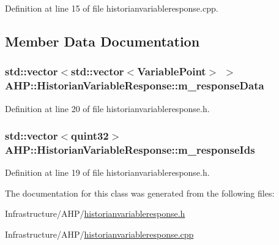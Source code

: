 Definition at line 15 of file historianvariableresponse.\+cpp.



\subsection{Member Data Documentation}
\hypertarget{class_a_h_p_1_1_historian_variable_response_a17ecd6aa355a87f5ae8bb6ee3d0eef50}{}
\subsubsection[{m\+\_\+response\+Data}]{\setlength{\rightskip}{0pt plus 5cm}std\+::vector$<$std\+::vector$<${\bf Variable\+Point}$>$ $>$ A\+H\+P\+::\+Historian\+Variable\+Response\+::m\+\_\+response\+Data\hspace{0.3cm}{\ttfamily [protected]}}\label{class_a_h_p_1_1_historian_variable_response_a17ecd6aa355a87f5ae8bb6ee3d0eef50}


Definition at line 20 of file historianvariableresponse.\+h.

\hypertarget{class_a_h_p_1_1_historian_variable_response_a3063661206ff4e004a58a5ecad41282b}{}
\subsubsection[{m\+\_\+response\+Ids}]{\setlength{\rightskip}{0pt plus 5cm}std\+::vector$<$quint32$>$ A\+H\+P\+::\+Historian\+Variable\+Response\+::m\+\_\+response\+Ids\hspace{0.3cm}{\ttfamily [protected]}}\label{class_a_h_p_1_1_historian_variable_response_a3063661206ff4e004a58a5ecad41282b}


Definition at line 19 of file historianvariableresponse.\+h.



The documentation for this class was generated from the following files\+:\begin{DoxyCompactItemize}
\item 
Infrastructure/\+A\+H\+P/\hyperlink{historianvariableresponse_8h}{historianvariableresponse.\+h}\item 
Infrastructure/\+A\+H\+P/\hyperlink{historianvariableresponse_8cpp}{historianvariableresponse.\+cpp}\end{DoxyCompactItemize}
